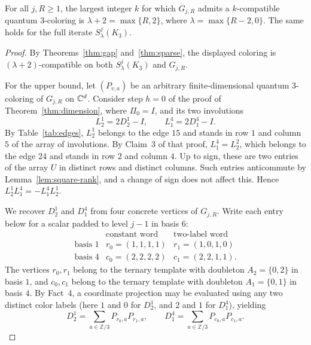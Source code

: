 \begin{proposition}\label{prop:largest-compatible-radius}
For all $j,R\ge1$, the largest integer $k$ for which $G_{j,R}$ admits a $k$-compatible quantum $3$-coloring is $\lambda+2=\max\{R,2\}$, where $\lambda=\max\{R-2,0\}$. The same holds for the full iterate $S^j_\lambda(K_3)$.
\end{proposition}
\begin{proof}
By Theorems~\ref{thm:gap} and~\ref{thm:sparse}, the displayed coloring is $(\lambda+2)$-compatible on both $S^j_\lambda(K_3)$ and $G_{j,R}$.

For the upper bound, let $(P_{v,a})$ be an arbitrary finite-dimensional quantum $3$-coloring of $G_{j,R}$ on $\mathbb C^d$. Consider step $h=0$ of the proof of Theorem~\ref{thm:dimension}, where $\Pi_0=I$, and its two involutions
\[
 L^1_2=2D^1_2-I,\qquad L^4_1=2D^4_1-I.
\]
By Table~\ref{tab:edges}, $L^1_2$ belongs to the edge $15$ and stands in row $1$ and column $5$ of the array of involutions. By Claim~3 of that proof, $L^4_1=L^2_2$, which belongs to the edge $24$ and stands in row $2$ and column $4$. Up to sign, these are two entries of the array $U$ in distinct rows and distinct columns. Such entries anticommute by Lemma~\ref{lem:square-rank}, and a change of sign does not affect this. Hence $L^1_2L^4_1=-L^4_1L^1_2$.

We recover $D^1_2$ and $D^4_1$ from four concrete vertices of $G_{j,R}$. Write each entry below for a scalar padded to level $j-1$ in basis $6$:
\[
\begin{array}{c|cc}
 &\text{constant word}&\text{two-label word}\\ \hline
 \text{basis }1&r_0=(1,1,1,1)&r_1=(1,0,1,0)\\
 \text{basis }4&c_0=(2,2,2,2)&c_1=(2,2,1,1).
\end{array}
\]
The vertices $r_0,r_1$ belong to the ternary template with doubleton $A_2=\{0,2\}$ in basis $1$, and $c_0,c_1$ belong to the ternary template with doubleton $A_1=\{0,1\}$ in basis $4$. By Fact~4, a coordinate projection may be evaluated using any two distinct color labels (here $1$ and $0$ for $D^1_2$, and $2$ and $1$ for $D^4_1$), yielding
\[
 D^1_2=\sum_{a\in\mathbb Z/3} P_{r_0,a}P_{r_1,a},\qquad
 D^4_1=\sum_{a\in\mathbb Z/3} P_{c_0,a}P_{c_1,a}.
\]


\end{proof}
